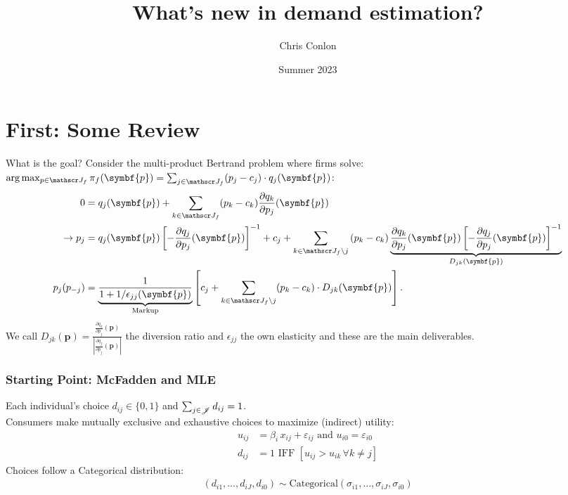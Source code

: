 \documentclass[aspectratio=169,10pt]{beamer}
\title{What's new in demand estimation?}
\author{Chris Conlon}
\institute{KU Leuven}
\date{Summer 2023}
\begin{document}
\begin{frame}[plain] %
\titlepage
\end{frame}


\section{First: Some Review}

\begin{frame}{What is the goal?}
\small
Consider the multi-product Bertrand problem where firms solve: $\arg \max_{p \in \calJ_f} \pi_f (\symbf{p}) = \sum_{j \in \calJ_f} (p_j - c_j) \cdot q_j(\symbf{p})$:
\begin{align*}
 0&= q_j(\symbf{p}) + \sum_{k \in \calJ_f} (p_k - c_k) \frac{\partial q_{k}}{\partial p_j}(\symbf{p}) \\
\rightarrow p_j &=q_{j}(\symbf{p}) \left[-\frac{\partial q_{j}}{\partial p_{j}}(\symbf{p})\right]^{-1} + c_{j} + \sum_{k \in \calJ_{f} \setminus j} \left(p_{k}-c_{k}\right) \underbrace{\frac{\partial q_{k}}{\partial p_{j}}(\symbf{p})\left[-\frac{\partial q_{j}}{\partial p_{j}}(\symbf{p})\right]^{-1}}_{D_{jk}(\symbf{p})}\\
p_j(p_{-j}) &= \underbrace{\frac{1}{1+1/\epsilon_{jj}(\symbf{p})}}_{\text{Markup}} \left[ c_j + \sum_{k \in \calJ_{f} \setminus j}  (p_k-c_k) \cdot  D_{jk} (\symbf{p}) \right].
\end{align*}
We call $D_{jk}(\symbf{p}) = \frac{\frac{\partial q_{k}}{\partial p_j}(\symbf{p})}{\left| \frac{\partial q_{j}}{\partial p_j}(\symbf{p}) \right|}$ the \alert{diversion ratio} and $\epsilon_{jj}$ the \alert{own elasticity} and these are the main deliverables.
\end{frame}

\begin{frame}
\frametitle{Starting Point: McFadden and MLE}
Each individual's choice $d_{ij} \in\{0,1\}$ and $\sum_{j \in \mathscr{J}} d_{ij} =1$.\\
Consumers make mutually exclusive and exhaustive choices to maximize (indirect) utility:
\begin{align*}
u_{ij} &= \beta_i \, x_{ij}  + \varepsilon_{ij} \text{ and }
u_{i0} = \varepsilon_{i0}\\
d_{ij} &=1 \text{ IFF } [u_{ij} > u_{ik}\, \forall k \neq j]
\end{align*}
Choices follow a Categorical distribution:
\begin{align*}
(d_{i1},\ldots,d_{iJ},d_{i0}) \sim \text{Categorical} (\sigma_{i1},\ldots,\sigma_{iJ},\sigma_{i0} ) 
\end{align*}
\end{frame}
\end{document}
